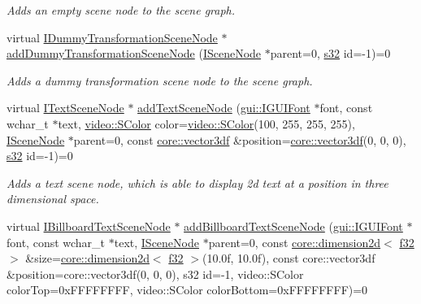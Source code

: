 \begin{DoxyCompactItemize}
\begin{DoxyCompactList}\small\item\em Adds an empty scene node to the scene graph. \end{DoxyCompactList}\item 
virtual \hyperlink{classirr_1_1scene_1_1IDummyTransformationSceneNode}{I\+Dummy\+Transformation\+Scene\+Node} $\ast$ \hyperlink{classirr_1_1scene_1_1ISceneManager_ad7aa119894aa960f428b7baefcedc58a}{add\+Dummy\+Transformation\+Scene\+Node} (\hyperlink{classirr_1_1scene_1_1ISceneNode}{I\+Scene\+Node} $\ast$parent=0, \hyperlink{namespaceirr_ac66849b7a6ed16e30ebede579f9b47c6}{s32} id=-\/1)=0
\begin{DoxyCompactList}\small\item\em Adds a dummy transformation scene node to the scene graph. \end{DoxyCompactList}\item 
\mbox{\label{classirr_1_1scene_1_1ISceneManager_ae3a173f0b0dd97e69251a22b5e4fbc0f}} 
virtual \hyperlink{classirr_1_1scene_1_1ITextSceneNode}{I\+Text\+Scene\+Node} $\ast$ \hyperlink{classirr_1_1scene_1_1ISceneManager_ae3a173f0b0dd97e69251a22b5e4fbc0f}{add\+Text\+Scene\+Node} (\hyperlink{classirr_1_1gui_1_1IGUIFont}{gui\+::\+I\+G\+U\+I\+Font} $\ast$font, const wchar\+\_\+t $\ast$text, \hyperlink{classirr_1_1video_1_1SColor}{video\+::\+S\+Color} color=\hyperlink{classirr_1_1video_1_1SColor}{video\+::\+S\+Color}(100, 255, 255, 255), \hyperlink{classirr_1_1scene_1_1ISceneNode}{I\+Scene\+Node} $\ast$parent=0, const \hyperlink{namespaceirr_1_1core_ae6e2b2a6c552833ebbd5b7463d03586b}{core\+::vector3df} \&position=\hyperlink{namespaceirr_1_1core_ae6e2b2a6c552833ebbd5b7463d03586b}{core\+::vector3df}(0, 0, 0), \hyperlink{namespaceirr_ac66849b7a6ed16e30ebede579f9b47c6}{s32} id=-\/1)=0
\begin{DoxyCompactList}\small\item\em Adds a text scene node, which is able to display 2d text at a position in three dimensional space. \end{DoxyCompactList}\item 
virtual \hyperlink{classirr_1_1scene_1_1IBillboardTextSceneNode}{I\+Billboard\+Text\+Scene\+Node} $\ast$ \hyperlink{classirr_1_1scene_1_1ISceneManager_a82e91e414ac6ad4f4c0eaa5b17ce3a44}{add\+Billboard\+Text\+Scene\+Node} (\hyperlink{classirr_1_1gui_1_1IGUIFont}{gui\+::\+I\+G\+U\+I\+Font} $\ast$font, const wchar\+\_\+t $\ast$text, \hyperlink{classirr_1_1scene_1_1ISceneNode}{I\+Scene\+Node} $\ast$parent=0, const \hyperlink{classirr_1_1core_1_1dimension2d}{core\+::dimension2d}$<$ \hyperlink{namespaceirr_a0277be98d67dc26ff93b1a6a1d086b07}{f32} $>$ \&size=\hyperlink{classirr_1_1core_1_1dimension2d}{core\+::dimension2d}$<$ \hyperlink{namespaceirr_a0277be98d67dc26ff93b1a6a1d086b07}{f32} $>$(10.\+0f, 10.\+0f), const core\+::vector3df \&position=core\+::vector3df(0, 0, 0), s32 id=-\/1, video\+::\+S\+Color color\+Top=0x\+F\+F\+F\+F\+F\+F\+F\+F, video\+::\+S\+Color color\+Bottom=0x\+F\+F\+F\+F\+F\+F\+F\+F)=0

\end{DoxyCompactItemize}
